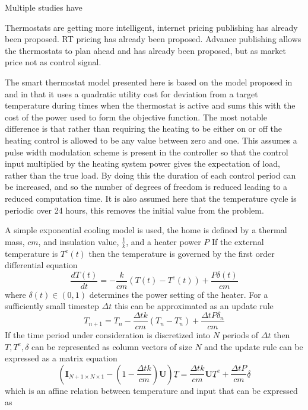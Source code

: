 \documentclass[a4paper, 10 pt, conference]{ieeeconf}  %
\begin{document}
Multiple studies have 

Thermostats are getting more intelligent, internet pricing publishing has already been proposed. RT pricing has already been proposed. Advance publishing allows the thermostats to plan ahead and has already been proposed, but as market price not as control signal\cite{rogers2011adaptive}.

The smart thermostat model presented here is based on the model proposed in and in that it uses a quadratic utility cost for deviation from a target temperature during times when the thermostat is active and sums this with the cost of the power used to form the objective function. The most notable difference is that rather than requiring the heating to be either on or off the heating control is allowed to be any value between zero and one. This assumes a pulse width modulation scheme is present in the controller so that the control input multiplied by the heating system power gives the expectation of load, rather than the true load. By doing this the duration of each control period can be increased, and so the number of degrees of freedom is reduced leading to a reduced computation time. It is also assumed here that the temperature cycle is periodic over 24 hours, this removes the initial value from the problem.

A simple exponential cooling model is used, the home is defined by a thermal mass, $cm$, and insulation value, $\frac{1}{k}$, and a heater power $P$ If the external temperature is $T^{e}(t)$ then the temperature is governed by the first order differential equation
\begin{equation}
\frac{dT(t)}{dt} = -\frac{k}{cm}(T(t)-T^{e}(t)) +\frac{P\delta(t)}{cm}
\end{equation}
where $\delta(t) \in (0,1)$ determines the power setting of the heater. For a sufficiently small timestep $\Delta t$  this can be approximated as an update rule
\begin{equation}
T_{n+1} =  T_{n}-\frac{\Delta t k}{cm}(T_{n}-T_{n}^{e}) + \frac{\Delta t P \delta_{n}}{cm} 
\end{equation}
If the time period under consideration is discretized into $N$ periods of $\Delta t$ then $T, T^{e},\delta$ can be represented as column vectors of size $N$ and the update rule can be expressed as a matrix equation
\begin{equation}
\left( \mathbf{I}_{N+1 \times N \times 1}-(1-\frac{\Delta t k}{cm})\mathbf{U}\right) \underline{T} = \frac{\Delta t k}{cm}\mathbf{U}\underline{T}^{e}+\frac{\Delta t P}{cm}\underline{\delta}
\end{equation}
which is an affine relation between temperature and input that can be expressed as
\end{document}
